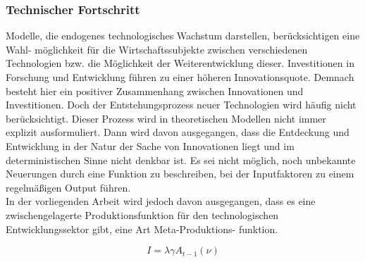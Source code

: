 \subsubsection{Technischer Fortschritt}
Modelle, die endogenes technologisches Wachstum darstellen, berücksichtigen eine Wahl- möglichkeit für die Wirtschaftssubjekte zwischen verschiedenen Technologien bzw. die Möglichkeit der Weiterentwicklung dieser. Investitionen in Forschung und Entwicklung führen zu einer höheren Innovationsquote. Demnach besteht hier ein positiver Zusammenhang zwischen Innovationen und Investitionen. Doch der Entstehungsprozess neuer Technologien wird häufig nicht berücksichtigt. Dieser Prozess wird in theoretischen Modellen nicht immer explizit ausformuliert. Dann wird davon ausgegangen, dass die Entdeckung und Entwicklung in der Natur der Sache von Innovationen liegt und im deterministischen Sinne nicht denkbar ist. Es sei nicht möglich, noch unbekannte Neuerungen durch eine Funktion zu beschreiben, bei der Inputfaktoren zu einem regelmä{\ss}igen Output führen.\\


In der vorliegenden Arbeit wird jedoch davon ausgegangen, dass es eine zwischengelagerte Produktionsfunktion für den technologischen Entwicklungssektor gibt, eine Art Meta-Produktions- funktion.


	\begin{equation}
		I=\lambda\gamma A_{t-1}(\nu)
	\end{equation}\label{Meta}


